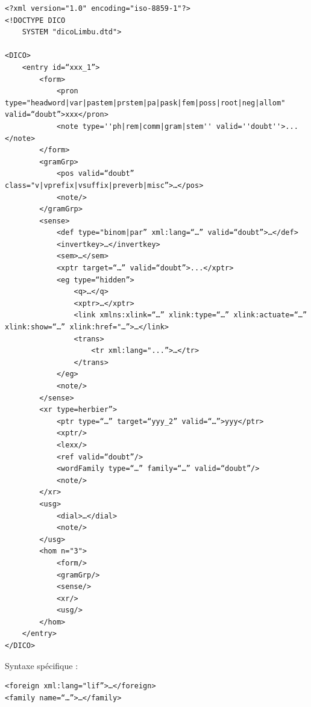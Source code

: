 \documentclass[a4paper,12pt]{article}
\begin{document}
\begin{lstlisting}[caption=Limbu XML format]
<?xml version="1.0" encoding="iso-8859-1"?>
<!DOCTYPE DICO
	SYSTEM "dicoLimbu.dtd">

<DICO>
	<entry id=“xxx_1”>
		<form>
			<pron type="headword|var|pastem|prstem|pa|pask|fem|poss|root|neg|allom" valid=“doubt”>xxx</pron>
			<note type=''ph|rem|comm|gram|stem'' valid=''doubt''>...</note>
		</form>
		<gramGrp>
			<pos valid=“doubt” class="v|vprefix|vsuffix|preverb|misc”>…</pos>
			<note/>
		</gramGrp>
		<sense>
			<def type="binom|par” xml:lang=“…” valid=“doubt”>…</def>
			<invertkey>…</invertkey>
			<sem>…</sem>
			<xptr target=“…” valid=“doubt”>...</xptr>
			<eg type=“hidden”>
				<q>…</q>
				<xptr>…</xptr>
				<link xmlns:xlink=“…” xlink:type=“…” xlink:actuate=“…” xlink:show=“…” xlink:href="…”>…</link>
				<trans>
					<tr xml:lang="...”>…</tr>
				</trans>
			</eg>
			<note/>
		</sense>
		<xr type=herbier”>
			<ptr type=“…” target=“yyy_2” valid=“…”>yyy</ptr>
			<xptr/>
			<lexx/>
			<ref valid=“doubt”/>
			<wordFamily type=“…” family=“…” valid=“doubt”/>
			<note/>
		</xr>
		<usg>
			<dial>…</dial>
			<note/>
		</usg>
		<hom n="3">
			<form/>
			<gramGrp/>
			<sense/>
			<xr/>
			<usg/>
		</hom>
	</entry>
</DICO>
\end{lstlisting}

Syntaxe spécifique :
\begin{lstlisting}[caption=Limbu syntax]
<foreign xml:lang="lif”>…</foreign>
<family name=“…”>…</family>
\end{lstlisting}
\end{document}

